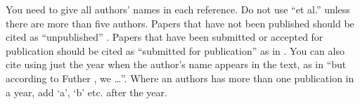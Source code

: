 \documentclass[12pt,a4paper]{article}
\begin{document}
You need to give all authors' names in each reference.  Do not use ``et al.'' unless there are more than five authors.  Papers that have not been published should be cited as ``unpublished'' \cite{euther}.  Papers that have been submitted or accepted for publication should be cited as ``submitted for publication'' as in \cite{futher} .  You can also cite using just the year when the author's name appears in the text, as in ``but according to Futher \citeyear{futher}, we \dots''.  Where an authors has more than one publication in a year, add `a', `b' etc. after the year.



\end{document}
